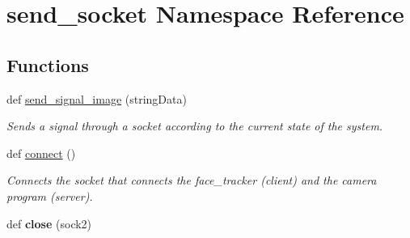 \hypertarget{namespacesend__socket}{}\section{send\+\_\+socket Namespace Reference}
\label{namespacesend__socket}
\subsection*{Functions}
\begin{DoxyCompactItemize}
\item 
def \hyperlink{namespacesend__socket_abce7379e72beda44d7177a197055ec68}{send\+\_\+signal\+\_\+image} (string\+Data)
\begin{DoxyCompactList}\small\item\em Sends a signal through a socket according to the current state of the system. \end{DoxyCompactList}\item 
def \hyperlink{namespacesend__socket_a5c1e3cf93df9eed6ab0baffb85720724}{connect} ()\hypertarget{namespacesend__socket_a5c1e3cf93df9eed6ab0baffb85720724}{}\label{namespacesend__socket_a5c1e3cf93df9eed6ab0baffb85720724}

\begin{DoxyCompactList}\small\item\em Connects the socket that connects the face\+\_\+tracker (client) and the camera program (server). \end{DoxyCompactList}\item 
def {\bfseries close} (sock2)\hypertarget{namespacesend__socket_ad61534298fa7934b63e5575ad2df5e50}{}\label{namespacesend__socket_ad61534298fa7934b63e5575ad2df5e50}


\end{DoxyCompactItemize}
